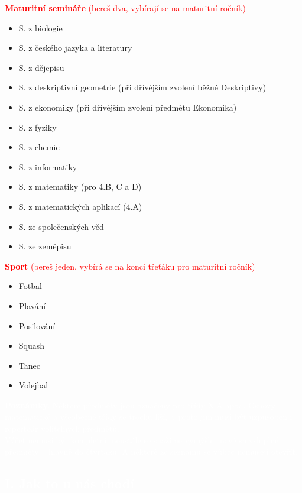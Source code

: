 \documentclass[a5paper, twoside]{article}
\newcommand{\polonadpis}[4]{
  \vspace*{-50pt}
  \begin{tcolorbox}[colback = #2, boxrule = 0pt, grow to left by = #4,  grow to right by = #4, arc=8pt, height = 30pt]
    \vspace*{5pt}
    \centering \subsection*{\textcolor{#3}{#1}}
  \end{tcolorbox}
}
\begin{document}
\begin{multicols}{2}
	\noindent \textcolor{red}{\textbf{Maturitní semináře} (bereš dva, vybírají se na maturitní ročník)}
	\begin{itemize}
		\item S. z biologie
		\item S. z českého jazyka a literatury
		\item S. z dějepisu
		\item S. z deskriptivní geometrie (při
		      dřívějším zvolení běžné Deskriptivy)
		\item S. z ekonomiky (při dřívějším zvolení předmětu Ekonomika)
		\item S. z fyziky
		\item S. z chemie
		\item S. z informatiky
		\item S. z matematiky (pro 4.B, C a D)
		\item S. z matematických aplikací (4.A)
		\item S. ze společenských věd
		\item S. ze zeměpisu
	\end{itemize}

	\noindent \textcolor{red}{\textbf{Sport} (bereš jeden, vybírá se na konci třeťáku pro maturitní ročník)}
	\begin{itemize}
		\item Fotbal
		\item Plavání
		\item Posilování
		\item Squash
		\item Tanec
		\item Volejbal
	\end{itemize}
\medskip
	\begin{tcolorbox}[colback=red,boxrule=0pt, sharp corners]
		\textcolor{white}{\footnotesize \textbf{Poznámky.}
			Některé předměty jsou označeny pro třídy X.A apod. Osnovy matematické a všeobecné třídy se trochu liší, a~proto jim musí být
			uzpůsoben i repertoár volitelných předmětů.\\
			Výčet nemusí být kompletní:
			neustále se snažíme vymýšlet nové smysluplné
			předměty -- hlavně do čtvrťáku. A některé ze
			seznamu se vůbec nemusejí otevřít.
      }

		\hfill
	\end{tcolorbox}
\end{multicols}

\newpage

\polonadpis{I. Jak to u nás chodí}{red}{white}{-4.1cm}
\end{document}
